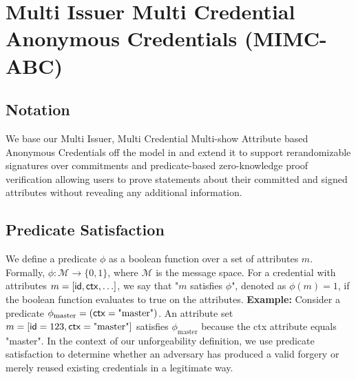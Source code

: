 \newpage
\section{Multi Issuer Multi Credential Anonymous Credentials (MIMC-ABC)}\label{sec:mimc}


\subsection{Notation}
We base our Multi Issuer, Multi Credential Multi-show Attribute based Anonymous Credentials off the model in \cite{fuchsbauer_structure-preserving_2019} and extend it to support rerandomizable signatures over commitments and predicate-based zero-knowledge proof verification allowing users to prove statements about their committed and signed attributes without revealing any additional information.

\subsection{Predicate Satisfaction}

We define a predicate $\phi$ as a boolean function over a set of attributes $m$. Formally, $\phi: \mathcal{M} \rightarrow \{0,1\}$, where $\mathcal{M}$ is the message space.
For a credential with attributes $m = [\mathsf{id}, \mathsf{ctx}, \ldots]$, we say that "$m$ satisfies $\phi$", denoted as $\phi(m) = 1$, if the boolean function evaluates to true on the attributes.
\textbf{Example:} Consider a predicate $\phi_{\text{master}} = (\mathsf{ctx} = \text{"master"})$. An attribute set $m = [\mathsf{id}=123, \mathsf{ctx}=\text{"master"}]$ satisfies $\phi_{\text{master}}$ because the ctx attribute equals "master".
In the context of our unforgeability definition, we use predicate satisfaction to determine whether an adversary has produced a valid forgery or merely reused existing credentials in a legitimate way.

